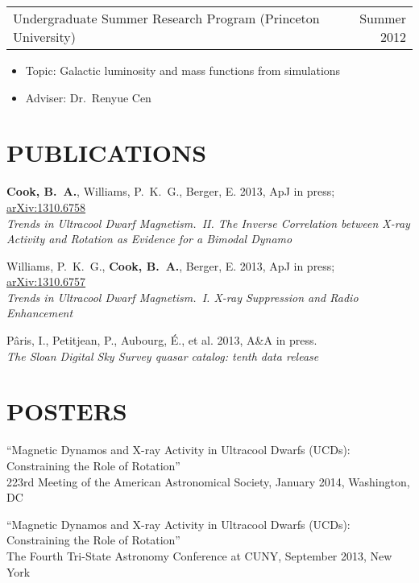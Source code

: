 \documentclass[margin]{res}
\begin{document}
\begin{resume}
\begin{itemize}
				 \end{itemize}
				 \begin{tabular}{@{}p{4in} r}
				 Undergraduate Summer Research Program
                                 (Princeton University) & Summer 2012
				 \end{tabular}
				 \begin{itemize} \itemsep -2pt
				 \item[] Topic: Galactic luminosity
                                   and mass functions from simulations
				 \item[] Adviser: Dr.~Renyue Cen
				 \end{itemize}

\section{PUBLICATIONS}

\textbf{Cook, B.~A.}, Williams, P.~K.~G., Berger, E. 2013,
ApJ in press; \href{http://arxiv.org/abs/1310.6758}{arXiv:1310.6758}\\ \textit{Trends in Ultracool
  Dwarf Magnetism.~II. The Inverse Correlation between X-ray Activity
  and Rotation as Evidence for a Bimodal Dynamo}

Williams, P.~K.~G., \textbf{Cook, B.~A.}, Berger, E. 2013,
ApJ in press; \href{http://arxiv.org/abs/1310.6757}{arXiv:1310.6757}\\ \textit{Trends in Ultracool
  Dwarf Magnetism.~I. X-ray Suppression and Radio Enhancement}

P\^{a}ris, I., Petitjean, P., Aubourg, \'E., et al. 2013, A\&A in
press.\\ \textit{The Sloan Digital Sky Survey quasar catalog: tenth
  data release}

\section{POSTERS}

``Magnetic Dynamos and X-ray Activity in Ultracool Dwarfs (UCDs):
Constraining the Role of Rotation''\\ 223rd Meeting of the American
Astronomical Society, January 2014, Washington, DC

``Magnetic Dynamos and X-ray Activity in Ultracool Dwarfs (UCDs):
Constraining the Role of Rotation''\\ The Fourth Tri-State Astronomy
Conference at CUNY, September 2013, New York


\end{resume} 
\end{document}

